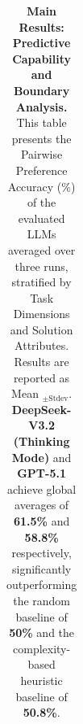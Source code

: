 \begin{table}[!ht]
\begin{tabular}{ll | ccc | ccc | ccc | c}
        \bottomrule
    \end{tabular}

    \caption{\textbf{Main Results: Predictive Capability and Boundary Analysis.} 
    This table presents the Pairwise Preference Accuracy (\%) of the evaluated LLMs averaged over three runs, stratified by Task Dimensions and Solution Attributes. Results are reported as Mean $_{\pm \text{Stdev}}$. 
    \textbf{DeepSeek-V3.2 (Thinking Mode)} and \textbf{GPT-5.1} achieve global averages of \textbf{61.5\%} and \textbf{58.8\%} respectively, significantly outperforming the random baseline of \textbf{50\%} and the complexity-based heuristic baseline of \textbf{50.8\%}.} 
    
    \label{tab:final_compact_matrix_clean}
    
\end{table}
